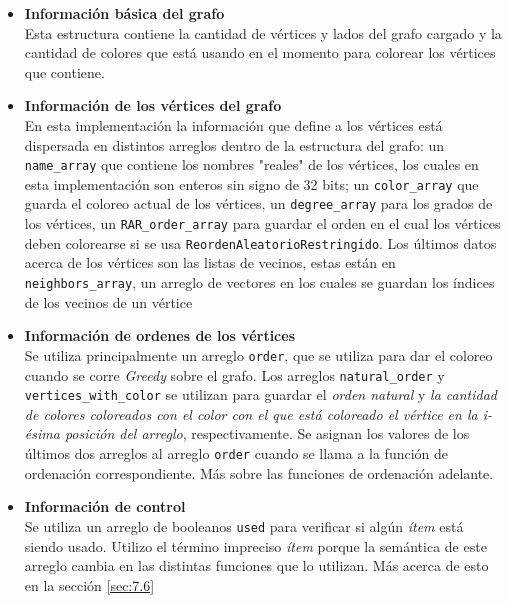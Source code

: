 \documentclass[11pt,a4paper]{article}
\theoremstyle{plain}
\begin{document}
\newpage
\begin{itemize}
\item\textbf{{Información básica del grafo}}\\

 Esta estructura contiene la cantidad de vértices y lados del grafo cargado y la cantidad de colores que está usando en el momento para colorear los vértices que contiene.\\

\item\textbf{{Información de los vértices del grafo}}\\
 
 En esta implementación la información que define a los vértices está dispersada en distintos arreglos dentro de la estructura del grafo: un \texttt{name\_array} que contiene los nombres "reales" de los vértices, los cuales en esta implementación son enteros sin signo de 32 bits; un \texttt{color\_array} que guarda el coloreo actual de los vértices, un \texttt{degree\_array} para los grados de los vértices, un \texttt{RAR\_order\_array} para guardar el orden en el cual los vértices deben colorearse si se usa \texttt{ReordenAleatorioRestringido}. Los últimos datos acerca de los vértices son las listas de vecinos, estas están en \texttt{neighbors\_array}, un arreglo de vectores en los cuales se guardan los índices de los vecinos de un vértice\\

\item\textbf{{Información de ordenes de los vértices}}\\

Se utiliza principalmente un arreglo \texttt{order}, que se utiliza para dar el coloreo cuando se corre \emph{Greedy} sobre el grafo. Los arreglos \texttt{natural\_order} y \texttt{vertices\_with\_color} se utilizan para guardar el \emph{orden natural} y \emph{la cantidad de colores coloreados con el color con el que está coloreado el vértice en la i-ésima posición del arreglo}, respectivamente. Se asignan los valores de los últimos dos arreglos al arreglo \texttt{order} cuando se llama a la función de ordenación correspondiente. Más sobre las funciones de ordenación adelante.

\item\textbf{{Información de control}}\\

Se utiliza un arreglo de booleanos \texttt{used} para verificar si algún \emph{ítem} está siendo usado. Utilizo el término impreciso \emph{ítem} porque la semántica de este arreglo cambia en las distintas funciones que lo utilizan. Más acerca de esto en la sección \ref{sec:7.6}


\end{itemize}
\end{document}
